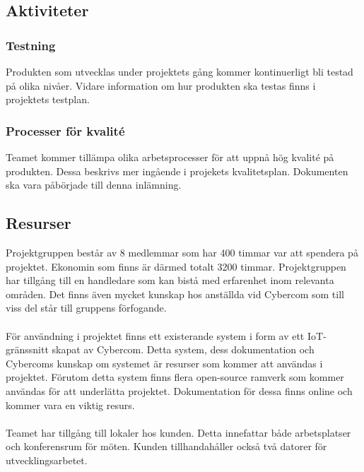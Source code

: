 \subsection{Aktiviteter}

\subsubsection*{Testning}
Produkten som utvecklas under projektets gång kommer kontinuerligt bli testad på olika nivåer. Vidare information om hur produkten ska testas finns i projektets testplan\cite{bib-testplan}.

\subsubsection*{Processer för kvalité}
Teamet kommer tillämpa olika arbetsprocesser för att uppnå hög kvalité på produkten. Dessa beskrivs mer ingående i projekets kvalitetsplan\cite{bib-kvalitetsplan}.
Dokumenten ska vara påbörjade till denna inlämning.

\subsection{Resurser}
Projektgruppen består av 8 medlemmar som har 400 timmar var att spendera på projektet. Ekonomin som finns är därmed totalt 3200 timmar. Projektgruppen har tillgång till en handledare som kan bistå med erfarenhet inom relevanta områden. Det finns även mycket kunskap hos anställda vid Cybercom som till viss del står till gruppens förfogande.\\
\\
För användning i projektet finns ett existerande system i form av ett IoT-gränssnitt skapat av Cybercom. Detta system,
dess dokumentation och Cybercoms kunskap om systemet är resurser som kommer att användas i projektet. Förutom detta
system finns flera open-source ramverk som kommer användas för att underlätta projektet. Dokumentation för dessa finns online och kommer vara en viktig resurs.\\
\\
Teamet har tillgång till lokaler hos kunden. Detta innefattar både arbetsplatser och konferensrum för möten. Kunden tillhandahåller också två datorer för utvecklingsarbetet. \\

\pagebreak

